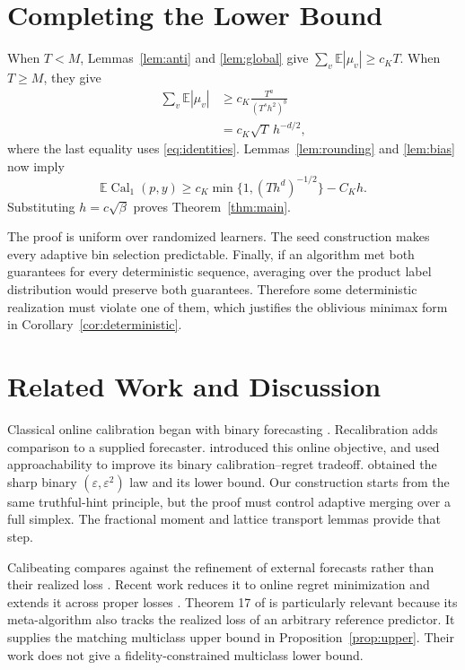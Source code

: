 \documentclass[twoside]{article}
\newcommand{\E}{\mathbb E}
\newcommand{\calone}{\operatorname{Cal}_1}
\newcommand{\1}{\mathbf 1}
\begin{document}
\section{Completing the Lower Bound}

When $T<M$, Lemmas~\ref{lem:anti} and \ref{lem:global} give $\sum_v\E|\mu_v|\geq c_KT$. When $T\geq M$, they give
\begin{align*}
 \sum_v\E|\mu_v|
 &\geq c_K\frac{T^a}{(T^sh^2)^b}\\
 &=c_K\sqrt T\,h^{-d/2},
\end{align*}
where the last equality uses \eqref{eq:identities}. Lemmas~\ref{lem:rounding} and \ref{lem:bias} now imply \[ \E\calone(p,y) \geq c_K\min\{1,(Th^d)^{-1/2}\}-C_Kh. \] Substituting $h=c\sqrt\beta$ proves Theorem~\ref{thm:main}.

The proof is uniform over randomized learners. The seed construction makes every adaptive bin selection predictable. Finally, if an algorithm met both guarantees for every deterministic sequence, averaging over the product label distribution would preserve both guarantees. Therefore some deterministic realization must violate one of them, which justifies the oblivious minimax form in Corollary~\ref{cor:deterministic}.

\section{Related Work and Discussion}

Classical online calibration began with binary forecasting \citep{foster1998asymptotic}. Recalibration adds comparison to a supplied forecaster. \citet{kuleshov2017estimating} introduced this online objective, and \citet{okoroafor2024faster} used approachability to improve its binary calibration--regret tradeoff. \citet{hu2026optimal} obtained the sharp binary $(\varepsilon,\varepsilon^2)$ law and its lower bound. Our construction starts from the same truthful-hint principle, but the proof must control adaptive merging over a full simplex. The fractional moment and lattice transport lemmas provide that step.

Calibeating compares against the refinement of external forecasts rather than their realized loss \citep{foster2023calibeating}. Recent work reduces it to online regret minimization and extends it across proper losses \citep{chen2026calibeating,foster2026proper,fichtl2026bregman}. Theorem 17 of \citet{chen2026calibeating} is particularly relevant because its meta-algorithm also tracks the realized loss of an arbitrary reference predictor. It supplies the matching multiclass upper bound in Proposition~\ref{prop:upper}. Their work does not give a fidelity-constrained multiclass lower bound.
\end{document}
